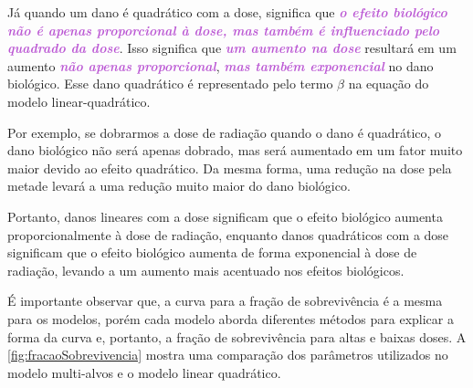 \documentclass[11pt,a4paper]{article}
\newcounter{exemplo}
\begin{document}
	Já quando um dano é quadrático com a dose, significa que \textcolor{MediumOrchid}{\textbf{\textit{o efeito biológico não é apenas proporcional à dose, mas também é influenciado pelo quadrado da dose}}}. Isso significa que \textcolor{MediumOrchid}{\textbf{\textit{um aumento na dose}}} resultará em um aumento\textcolor{MediumOrchid}{\textbf{\textit{ não apenas proporcional}}}, \textcolor{MediumOrchid}{\textbf{\textit{mas também exponencial}}} no dano biológico. Esse dano quadrático é representado pelo termo $\beta$ na equação do modelo linear-quadrático.

	Por exemplo, se dobrarmos a dose de radiação quando o dano é quadrático, o dano biológico não será apenas dobrado, mas será aumentado em um fator muito maior devido ao efeito quadrático. Da mesma forma, uma redução na dose pela metade levará a uma redução muito maior do dano biológico.

	Portanto, danos lineares com a dose significam que o efeito biológico aumenta proporcionalmente à dose de radiação, enquanto danos quadráticos com a dose significam que o efeito biológico aumenta de forma exponencial à dose de radiação, levando a um aumento mais acentuado nos efeitos biológicos.

	É importante observar que, a curva para a fração de sobrevivência é a mesma para os modelos, porém cada modelo aborda diferentes métodos para explicar a forma da curva e, portanto, a fração de sobrevivência para altas e baixas doses. A \ref{fig:fracaoSobrevivencia} mostra uma comparação dos parâmetros utilizados no modelo multi-alvos e o modelo linear quadrático.
\end{document}
